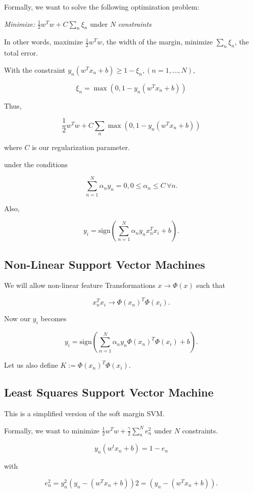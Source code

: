 Formally, we want to solve the following optimization problem:

\emph{Minimize:} \(\frac{1}{2} w^T w + C \sum_n \xi_n\) under \(N\) \emph{constraints}

In other words, maximize \(\frac{1}{2}w^Tw\), the width of the margin, minimize \(\sum_n \xi_n\), the total error.

With the constraint \(y_n (w^T x_n + b) \ge 1 - \xi_n, (n = 1, \dots, N)\),

\[
	\xi_n = \max (0, 1 - y_n (w^T x_n + b))
\]

Thus,

\[
	\frac{1}{2} w^T w + C \sum_n \max (0, 1 - y_n (w^T x_n + b))
\]

where \(C\) is our regularization parameter.

under the conditions

\[
	\sum_{n = 1}^{N} \alpha_n y_n = 0, 0 \le \alpha_n \le C \, \forall n.
\]

Also,

\[
	y_i = \text{sign} \left(\sum_{n = 1}^{N} \alpha_n y_n x_n^T x_i + b \right).
\]

\subsection{Non-Linear Support Vector Machines}

We will allow non-linear feature Transformations \(x \to \Phi(x)\) such that

\[
	x_n^Tx_i \to \Phi(x_n)^T \Phi(x_i).
\]

Now our \(y_i\) becomes

\[
	y_i = \text{sign} \left(\sum_{n = 1}^{N} \alpha_n y_n \Phi(x_n)^T \Phi(x_i) + b \right).
\]

Let us also define \(K:= \Phi(x_n)^T \Phi(x_i)\).

\subsection{Least Squares Support Vector Machine}

This is a simplified version of the soft margin SVM.

Formally, we want to minimize \(\frac{1}{2} w^T w + \frac{\gamma}{2} \sum_n^N e_n^2\) under \(N\) constraints.

\[
	y_n(w^t x_n + b) = 1 - e_n
\]

with

\[
	e_n^2 = y_n^2 (y_n - (w^T x_n + b))2 = (y_n - (w^T x_n + b)).
\]

